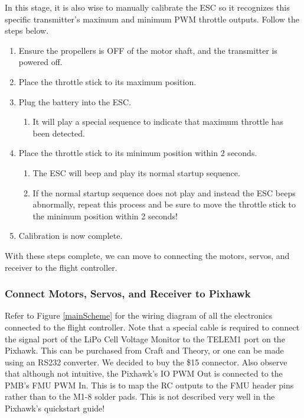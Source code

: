 \documentclass[12pt,journal,compsoc]{IEEEtran}
\begin{document}
In this stage, it is also wise to manually calibrate the ESC so it recognizes this specific transmitter's maximum and minimum PWM throttle outputs. Follow the steps below.

\begin{enumerate}
\item Ensure the propellers is OFF of the motor shaft, and the transmitter is powered off.
\item Place the throttle stick to its maximum position.
\item Plug the battery into the ESC.
	\begin{enumerate}
	\item It will play a special sequence to indicate that maximum throttle has been detected.
	\end{enumerate}
\item Place the throttle stick to its minimum position within 2 seconds.
	\begin{enumerate}
	\item The ESC will beep and play its normal startup sequence.
	\item If the normal startup sequence does not play and instead the ESC beeps abnormally, repeat this process and be sure to move the throttle stick to the minimum position within 2 seconds!
	\end{enumerate}
\item Calibration is now complete.
\end{enumerate}

With these steps complete, we can move to connecting the motors, servos, and receiver to the flight controller.

\subsubsection{Connect Motors, Servos, and Receiver to Pixhawk}
Refer to Figure \ref{mainScheme} for the wiring diagram of all the electronics connected to the flight controller. Note that a special cable is required to connect the signal port of the LiPo Cell Voltage Monitor to the TELEM1 port on the Pixhawk. This can be purchased from Craft and Theory, or one can be made using an RS232 converter. We decided to buy the \$15 connector. Also observe that although not intuitive, the Pixhawk's IO PWM Out is connected to the PMB's FMU PWM In. This is to map the RC outputs to the FMU header pins rather than to the M1-8 solder pads. This is not described very well in the Pixhawk's quickstart guide!
\end{document}
